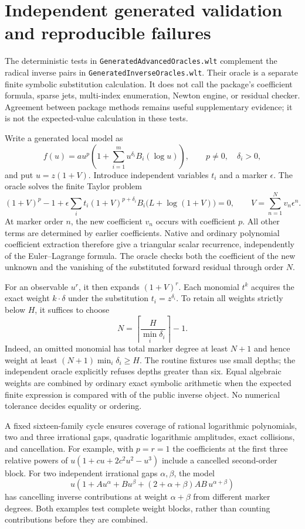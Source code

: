 \section{Independent generated validation and reproducible failures}
\label{sec:generated-validation}

The deterministic tests in \texttt{GeneratedAdvancedOracles.wlt} complement
the radical inverse pairs in \texttt{GeneratedInverseOracles.wlt}. Their
oracle is a separate finite symbolic substitution calculation. It does not
call the package's coefficient formula, sparse jets, multi-index enumeration,
Newton engine, or residual checker. Agreement between package methods remains
useful supplementary evidence; it is not the expected-value calculation in
these tests.

Write a generated local model as
\[
 f(u)=a u^p\left(1+\sum_{i=1}^{m}u^{\delta_i}B_i(\log u)\right),
 \qquad p\ne0,\quad \delta_i>0,
\]
and put $u=z(1+V)$. Introduce independent variables $t_i$ and a marker
$\epsilon$. The oracle solves the finite Taylor problem
\[
 (1+V)^p-1+
 \epsilon\sum_i t_i(1+V)^{p+\delta_i}
 B_i\bigl(L+\log(1+V)\bigr)=0,
 \qquad V=\sum_{n=1}^{N}v_n\epsilon^n.
\]
At marker order $n$, the new coefficient $v_n$ occurs with coefficient $p$.
All other terms are determined by earlier coefficients. Native
 and ordinary polynomial coefficient extraction therefore give
a triangular scalar recurrence, independently of the Euler--Lagrange
formula. The oracle checks both the coefficient of the new unknown and the
vanishing of the substituted forward residual through order $N$.

For an observable $u^r$, it then expands $(1+V)^r$. Each monomial
$t^k$ acquires the exact weight $k\cdot\delta$ under the substitution
$t_i=z^{\delta_i}$. To retain all weights strictly below $H$, it suffices to
choose
\[
 N=\left\lceil\frac{H}{\min_i\delta_i}\right\rceil-1.
\]
Indeed, an omitted monomial has total marker degree at least $N+1$ and hence
weight at least $(N+1)\min_i\delta_i\ge H$. The routine fixtures use small
depths; the independent oracle explicitly refuses depths greater than six.
Equal algebraic weights are combined by ordinary exact symbolic arithmetic
when the expected finite expression is compared with  of the
public inverse object. No numerical tolerance decides equality or ordering.

A fixed sixteen-family cycle ensures coverage of rational logarithmic
polynomials, two and three irrational gaps, quadratic logarithmic
amplitudes, exact collisions, and cancellation. For example, with
$p=r=1$ the coefficients at the first three relative powers of
$u(1+c u+2c^2u^2-u^3)$ include a cancelled second-order block.
For two independent irrational gaps $\alpha,\beta$, the model
\[
 u\left(1+A u^\alpha+B u^\beta+
 (2+\alpha+\beta)AB\,u^{\alpha+\beta}\right)
\]
has cancelling inverse contributions at weight $\alpha+\beta$ from
different marker degrees. Both examples test complete weight blocks,
rather than counting contributions before they are combined.

